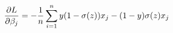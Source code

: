 \documentclass[preview]{standalone}
\begin{document}
\begin{align*}
\special{dvisvgm:raw <g id='unique000'>}\frac{\partial{L}}{\partial\beta_j}=-\frac{1}{n}\sum^n_{i=1}y(1-\sigma(z))x_j-(1-y)\sigma(z)x_j\special{dvisvgm:raw </g>}
\end{align*}
\end{document}

